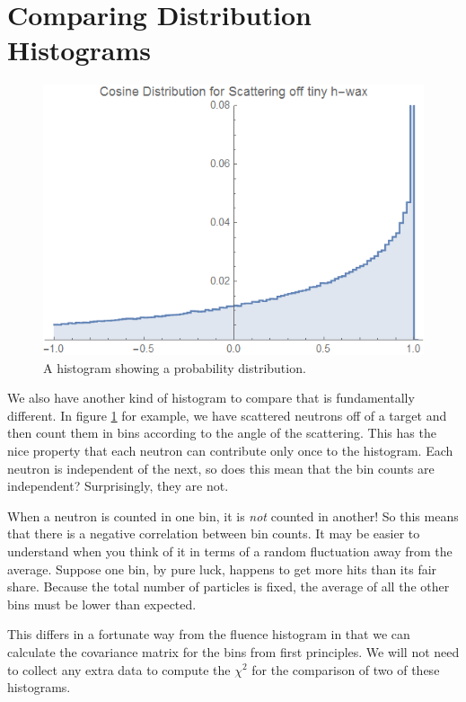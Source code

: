 \documentclass[letterpaper,12pt]{article}
\begin{document}
\section{Comparing Distribution Histograms}

\begin{figure}[ht] 
	\centering	\includegraphics[width=0.7\columnwidth]{CosineDistributionMCNP}
	\caption{
		\label{fig.cosine}
		A histogram showing a probability distribution.
	}
\end{figure}

We also have another kind of histogram to compare that is fundamentally different. In figure \ref{fig.cosine} for example, we have scattered neutrons off of a target and then count them in bins according to the angle of the scattering. This has the nice property that each neutron can contribute only once to the histogram. Each neutron is independent of the next, so does this mean that the bin counts are independent? Surprisingly, they are not.

When a neutron is counted in one bin, it is \textit{not} counted in another! So this means that there is a negative correlation between bin counts. It may be easier to understand when you think of it in terms of a random fluctuation away from the average. Suppose one bin, by pure luck, happens to get more hits than its fair share. Because the total number of particles is fixed, the average of all the other bins must be lower than expected.

This differs in a fortunate way from the fluence histogram in that we can calculate the covariance matrix for the bins from first principles. We will not need to collect any extra data to compute the $\chi^2$ for the comparison of two of these histograms.
\end{document}
